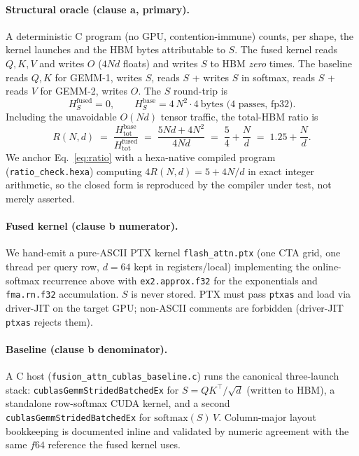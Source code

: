 \documentclass[11pt,a4paper]{article}
\newcommand{\verdict}[1]{\texttt{#1}}
\begin{document}
\paragraph{Structural oracle (clause a, primary).}
A deterministic C program (no GPU, contention-immune) counts, per shape, the
kernel launches and the HBM bytes attributable to $S$. The fused kernel reads
$Q,K,V$ and writes $O$ ($4Nd$ floats) and writes $S$ to HBM \emph{zero} times.
The baseline reads $Q,K$ for GEMM-1, writes $S$, reads $S$ + writes $S$ in
softmax, reads $S$ + reads $V$ for GEMM-2, writes $O$. The $S$ round-trip is
\begin{equation}
  H^{\mathrm{fused}}_S = 0,\qquad
  H^{\mathrm{base}}_S = 4\,N^2\cdot 4~\text{bytes (4 passes, fp32)} .
  \label{eq:shbm}
\end{equation}
Including the unavoidable $O(Nd)$ tensor traffic, the total-HBM ratio is
\begin{equation}
  R(N,d) \;=\; \frac{H^{\mathrm{base}}_{\mathrm{tot}}}{H^{\mathrm{fused}}_{\mathrm{tot}}}
  \;=\; \frac{5Nd + 4N^2}{4Nd} \;=\; \frac{5}{4} + \frac{N}{d}
  \;=\; 1.25 + \frac{N}{d}.
  \label{eq:ratio}
\end{equation}
We anchor Eq.~\eqref{eq:ratio} with a hexa-native compiled program
(\verdict{ratio\_check.hexa}) computing $4R(N,d)=5+4N/d$ in exact integer
arithmetic, so the closed form is reproduced by the compiler under test, not
merely asserted.

\paragraph{Fused kernel (clause b numerator).}
We hand-emit a pure-ASCII PTX kernel \verdict{flash\_attn.ptx} (one CTA grid,
one thread per query row, $d{=}64$ kept in registers/local) implementing the
online-softmax recurrence above with \verdict{ex2.approx.f32} for the
exponentials and \verdict{fma.rn.f32} accumulation. $S$ is never stored. PTX
must pass \verdict{ptxas} and load via driver-JIT on the target GPU; non-ASCII
comments are forbidden (driver-JIT \verdict{ptxas} rejects them).

\paragraph{Baseline (clause b denominator).}
A C host (\verdict{fusion\_attn\_cublas\_baseline.c}) runs the canonical
three-launch stack: \verdict{cublasGemmStridedBatchedEx} for $S=QK^\top/\sqrt{d}$
(written to HBM), a standalone row-softmax CUDA kernel, and a second
\verdict{cublasGemmStridedBatchedEx} for $\mathrm{softmax}(S)\,V$. Column-major
layout bookkeeping is documented inline and validated by numeric agreement with
the same $f64$ reference the fused kernel uses.
\end{document}
